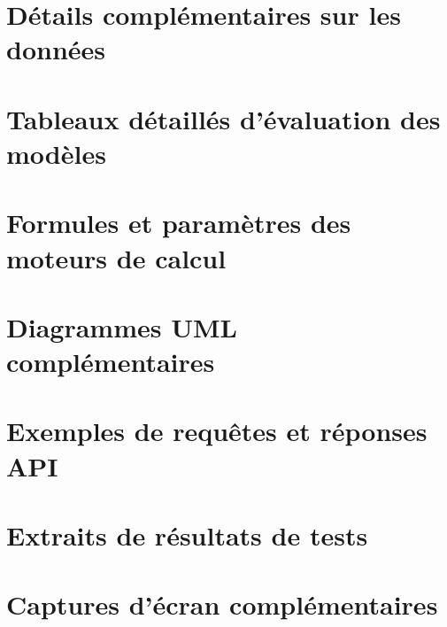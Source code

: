 
\chapter{Détails complémentaires sur les données}

\chapter{Tableaux détaillés d'évaluation des modèles}

\chapter{Formules et paramètres des moteurs de calcul}

\chapter{Diagrammes UML complémentaires}

\chapter{Exemples de requêtes et réponses API}

\chapter{Extraits de résultats de tests}

\chapter{Captures d'écran complémentaires}

